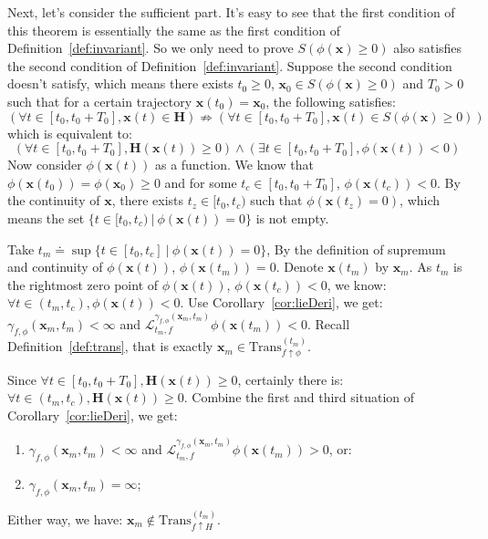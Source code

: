 \documentclass{jssc}
\begin{document}
Next, let's consider the sufficient part. It's easy to see that the first condition of this theorem is essentially the same as the first condition of Definition~\ref{def:invariant}. So we only need to prove $S(\phi(\boldsymbol{x}) \geq 0)$ also satisfies the second condition of Definition~\ref{def:invariant}. Suppose the second condition doesn't satisfy, which means there exists $t_0 \geq 0$, $\boldsymbol{x}_0 \in S(\phi(\boldsymbol{x}) \geq 0)$ and $T_0 > 0$ such that for a certain trajectory $\boldsymbol{x}(t_0) = \boldsymbol{x}_0$, the following satisfies:
	\begin{equation*}
		(\forall t \in [t_0, t_0 + T_0], \boldsymbol{x}(t) \in \boldsymbol{H}) \nRightarrow (\forall t \in [t_0, t_0 + T_0], \boldsymbol{x}(t) \in S(\phi(\boldsymbol{x}) \geq 0))
	\end{equation*}
which is equivalent to:
	\begin{equation*}
		(\forall t \in [t_0, t_0 + T_0], \boldsymbol{H}(\boldsymbol{x}(t)) \geq 0) \wedge (\exists t \in [t_0, t_0 + T_0], \phi(\boldsymbol{x}(t)) < 0)
	\end{equation*}
Now consider $\phi(\boldsymbol{x}(t))$ as a function. We know that $\phi(\boldsymbol{x}(t_0)) = \phi(\boldsymbol{x}_0) \geq 0$ and for some $t_c \in [t_0, t_0 + T_0]$, $\phi(\boldsymbol{x}(t_c)) < 0$. By the continuity of $\boldsymbol{x}$, there exists $t_z \in [t_0, t_c)$ such that $\phi(\boldsymbol{x}(t_z) = 0)$, which means the set $\{ t \in [t_0, t_c)\ |\ \phi(\boldsymbol{x}(t)) = 0 \}$ is not empty.

Take $t_m \doteq \sup\{t \in [t_0, t_c]\ |\ \phi (\boldsymbol{x}(t)) = 0 \}$, By the definition of supremum and continuity of $\phi(\boldsymbol{x}(t))$, $\phi(\boldsymbol{x}(t_m)) = 0$. Denote $\boldsymbol{x}(t_m)$ by $\boldsymbol{x}_m$. As $t_m$ is the rightmost zero point of $\phi(\boldsymbol{x}(t))$, $\phi(\boldsymbol{x}(t_c)) < 0$, we know: $\forall t \in (t_m, t_c),\phi(\boldsymbol{x}(t)) < 0$. Use Corollary~\ref{cor:lieDeri}, we get:  $\gamma_{f, \phi}(\boldsymbol{x}_m, t_m) < \infty$ and $\mathcal{L}_{t_m, f}^{\gamma_{f, \phi}(\boldsymbol{x}_m, t_m)} \phi (\boldsymbol{x}(t_m)) < 0$. Recall Definition~\ref{def:trans}, that is exactly $\boldsymbol{x}_m \in \mathrm{Trans}_{f \uparrow \phi}^{(t_m)}$.

Since $\forall t \in [t_0, t_0 + T_0], \boldsymbol{H}(\boldsymbol{x}(t)) \geq 0$, certainly there is: $\forall t \in (t_m, t_c),\boldsymbol{H}(\boldsymbol{x}(t)) \geq 0$. Combine the first and third situation of Corollary~\ref{cor:lieDeri}, we get:
\begin{enumerate}
	\item $\gamma_{f, \phi}(\boldsymbol{x}_m, t_m) < \infty$ and $\mathcal{L}_{t_m, f}^{\gamma_{f, \phi}(\boldsymbol{x}_m, t_m)} \phi (\boldsymbol{x}(t_m)) > 0$, or:
	\item $\gamma_{f, \phi}(\boldsymbol{x}_m, t_m) = \infty$;
\end{enumerate}
Either way, we have: $\boldsymbol{x}_m \notin \mathrm{Trans}_{f \uparrow H}^{(t_m)}$.
\end{document}
